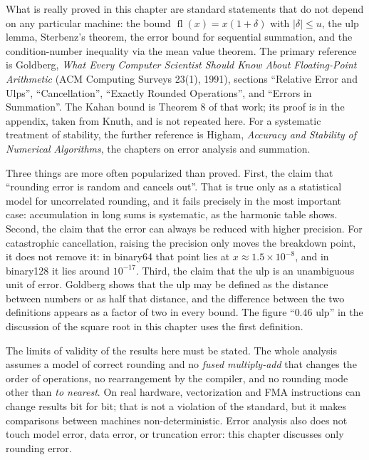 \begin{untukpeneliti}
What is really proved in this chapter are standard statements that do not
depend on any particular machine: the bound $\operatorname{fl}(x)=x(1+\delta)$ with
$|\delta|\le u$, the ulp lemma, Sterbenz's theorem, the error bound for sequential
summation, and the condition-number inequality via the mean value theorem. The primary
reference is Goldberg,
\emph{What Every Computer Scientist Should Know About Floating-Point Arithmetic}
(ACM Computing Surveys 23(1), 1991), sections ``Relative Error and Ulps'',
``Cancellation'', ``Exactly Rounded Operations'', and ``Errors in Summation''. The Kahan
bound is Theorem 8 of that work; its proof is in the appendix, taken from Knuth, and is
not repeated here. For a systematic treatment of stability, the further reference is
Higham, \emph{Accuracy and Stability of Numerical Algorithms}, the chapters on error
analysis and summation.

Three things are more often popularized than proved. First, the claim that
``rounding error is random and cancels out''. That is true only as a statistical
model for uncorrelated rounding, and it fails precisely in the most important case:
accumulation in long sums is systematic, as the harmonic table shows. Second, the claim
that the error can always be reduced with higher precision. For catastrophic
cancellation, raising the precision only moves the breakdown point, it does not remove
it: in binary64 that point lies at
$x\approx1.5\times10^{-8}$, and in binary128 it lies around $10^{-17}$. Third, the claim
that the ulp is an unambiguous unit of error. Goldberg shows that the
ulp may be defined as the distance between numbers or as half that distance, and the
difference between the two definitions appears as a factor of two in every bound. The
figure ``$0.46$ ulp'' in the discussion of the square root in this chapter uses the first
definition.

The limits of validity of the results here must be stated. The whole analysis assumes a model of
correct rounding and no \emph{fused multiply-add} that changes the order of operations,
no rearrangement by the compiler, and no rounding mode other than
\emph{to nearest}. On real hardware, vectorization and FMA instructions can change
results bit for bit; that is not a violation of the standard, but it makes comparisons
between machines non-deterministic. Error analysis also does not touch model error,
data error, or truncation error: this chapter discusses only rounding error.


\end{untukpeneliti}
